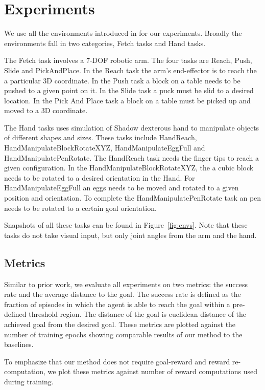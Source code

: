 \section{Experiments}
\label{sec:experiments}
We use all the environments  introduced in \citet{plappert2018multi} for our experiments.
Broadly the environments fall in two categories, Fetch tasks and Hand tasks.

The Fetch task involves a 7-DOF robotic arm. The four tasks are Reach, Push,
Slide and PickAndPlace.
In the Reach task the arm's end-effector is to reach the a particular 3D coordinate. 
In the Push task a block on a table needs to be pushed to a given point on it.
In the Slide task a puck must be slid to a desired location.
In the Pick And Place task a block on a table must be picked up and moved to a
3D coordinate.

The Hand tasks uses simulation of Shadow dexterous hand to manipulate objects of
different shapes and sizes. These tasks include HandReach,
HandManipulateBlockRotateXYZ, HandManipulateEggFull and HandManipulatePenRotate.
The HandReach task needs the finger tips to reach a given configuration.
In the HandManipulateBlockRotateXYZ, the a cubic block needs to be rotated to a
desired orientation in the Hand.
For HandManipulateEggFull an eggs needs to be moved and rotated to a given
position and orientation.
To complete the HandManipulatePenRotate task an pen needs to be rotated to a
certain goal orientation.

Snapshots of all these tasks can be found in Figure~\ref{fig:envs}. Note that
these tasks do not take visual input, but only joint angles from the arm and the hand.


\subsection{Metrics}
Similar to prior work, we evaluate all experiments on two metrics: the success
rate and the average distance to the goal. The success rate is defined as the
fraction of episodes in which the agent is able to reach the goal within a
pre-defined threshold region.
The distance of the goal is euclidean distance of the
achieved goal from the desired goal.
These metrics are plotted against the number of training epochs showing
comparable results of our method to the baselines.

To emphasize that our method does not require goal-reward
and reward re-computation, we plot these metrics against
number of reward computations used during training.

